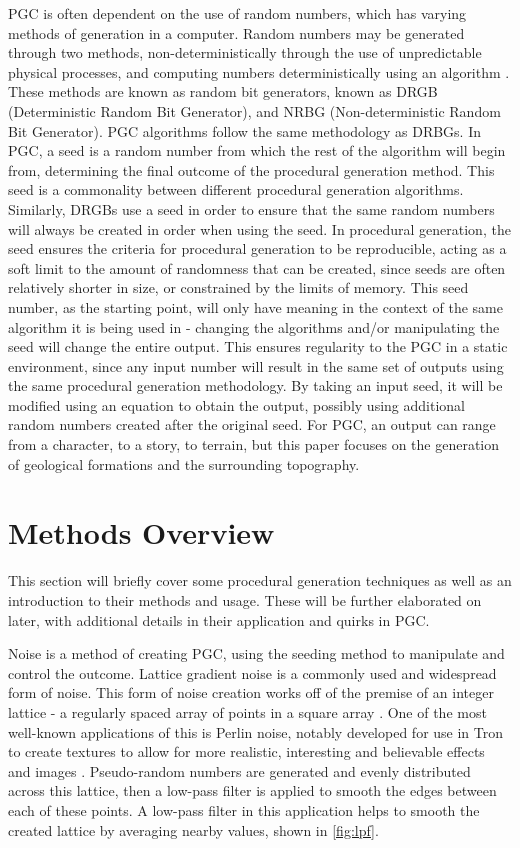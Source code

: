 \documentclass[10pt]{report}
\begin{document}
		PGC is often dependent on the use of random numbers, which has varying methods of generation in a computer. Random numbers may be generated through two methods, non-deterministically through the use of unpredictable physical processes, and computing numbers deterministically using an algorithm \cite{rng}. These methods are known as random bit generators, known as DRGB (Deterministic Random Bit Generator), and NRBG (Non-deterministic Random Bit Generator). PGC algorithms follow the same methodology as DRBGs. In PGC, a seed is a random number from which the rest of the algorithm will begin from, determining the final outcome of the procedural generation method. This seed is a commonality between different procedural generation algorithms. Similarly, DRGBs use a seed in order to ensure that the same random numbers will always be created in order when using the seed. In procedural generation, the seed ensures the criteria for procedural generation to be reproducible, acting as a soft limit to the amount of randomness that can be created, since seeds are often relatively shorter in size, or constrained by the limits of memory. This seed number, as the starting point, will only have meaning in the context of the same algorithm it is being used in - changing the algorithms and/or manipulating the seed will change the entire output. This ensures regularity to the PGC in a static environment, since any input number will result in the same set of outputs using the same procedural generation methodology. By taking an input seed, it will be modified using an equation to obtain the output, possibly using additional random numbers created after the original seed. For PGC, an output can range from a character, to a story, to terrain, but this paper focuses on the generation of geological formations and the surrounding topography.
	
		\section{Methods Overview}
		This section will briefly cover some procedural generation techniques as well as an introduction to their methods and usage. These will be further elaborated on later, with additional details in their application and quirks in PGC. 
		
		Noise is a method of creating PGC, using the seeding method to manipulate and control the outcome. Lattice gradient noise is a commonly used and widespread form of noise. This form of noise creation works off of the premise of an integer lattice - a regularly spaced array of points in a square array \cite{integer-lattice}. One of the most well-known applications of this is Perlin noise, notably developed for use in Tron to create textures to allow for more realistic, interesting and believable effects and images \cite{ken-perlin}. Pseudo-random numbers are generated and evenly distributed across this lattice, then a low-pass filter is applied to smooth the edges between each of these points. A low-pass filter in this application helps to smooth the created lattice by averaging nearby values, shown in \autoref{fig:lpf}. 
		
\end{document}
